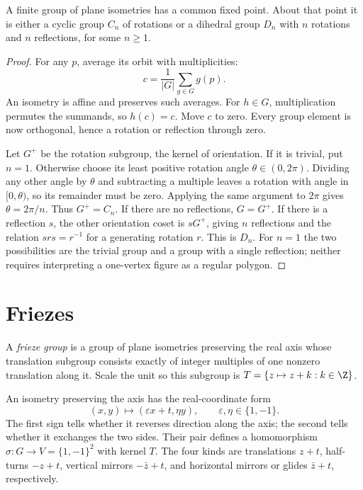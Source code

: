 \begin{theorem}\label{geometry:thm:leonardo}
A finite group of plane isometries has a common fixed point. About that point it is either a cyclic group $C_n$ of rotations or a dihedral group $D_n$ with $n$ rotations and $n$ reflections, for some $n\ge1$.
\end{theorem}
\begin{proof}
For any $p$, average its orbit with multiplicities:
\[
c=\frac1{|G|}\sum_{g\in G}g(p).
\]
An isometry is affine and preserves such averages. For $h\in G$, multiplication permutes the summands, so $h(c)=c$. Move $c$ to zero. Every group element is now orthogonal, hence a rotation or reflection through zero.

Let $G^+$ be the rotation subgroup, the kernel of orientation. If it is trivial, put $n=1$. Otherwise choose its least positive rotation angle $\theta\in(0,2\pi)$. Dividing any other angle by $\theta$ and subtracting a multiple leaves a rotation with angle in $[0,\theta)$, so its remainder must be zero. Applying the same argument to $2\pi$ gives $\theta=2\pi/n$. Thus $G^+=C_n$. If there are no reflections, $G=G^+$. If there is a reflection $s$, the other orientation coset is $sG^+$, giving $n$ reflections and the relation $srs=r^{-1}$ for a generating rotation $r$. This is $D_n$. For $n=1$ the two possibilities are the trivial group and a group with a single reflection; neither requires interpreting a one-vertex figure as a regular polygon.
\end{proof}

\section{Friezes}

\begin{definition}\label{geometry:def:frieze}
A \emph{frieze group} is a group of plane isometries preserving the real axis whose translation subgroup consists exactly of integer multiples of one nonzero translation along it. Scale the unit so this subgroup is $T=\{z\mapsto z+k:k\in\Z\}$.
\end{definition}

An isometry preserving the axis has the real-coordinate form
\[
(x,y)\longmapsto(\varepsilon x+t,\eta y),\qquad \varepsilon,\eta\in\{1,-1\}.
\]
The first sign tells whether it reverses direction along the axis; the second tells whether it exchanges the two sides. Their pair defines a homomorphism $\sigma:G\to V=\{1,-1\}^2$ with kernel $T$. The four kinds are translations $z+t$, half-turns $-z+t$, vertical mirrors $-\bar z+t$, and horizontal mirrors or glides $\bar z+t$, respectively.

